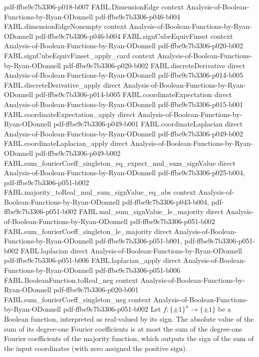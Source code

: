 \begin{theorem}
  {pdf-ffbe9c7b3306-p018-b007}
\proofstep
  {FABL.DimensionEdge}
  {context}
  {Analysis-of-Boolean-Functions-by-Ryan-ODonnell}
  {pdf-ffbe9c7b3306-p046-b004}
\proofstep
  {FABL.dimensionEdgeNonempty}
  {context}
  {Analysis-of-Boolean-Functions-by-Ryan-ODonnell}
  {pdf-ffbe9c7b3306-p046-b004}
\proofstep
  {FABL.signCubeEquivFinset}
  {context}
  {Analysis-of-Boolean-Functions-by-Ryan-ODonnell}
  {pdf-ffbe9c7b3306-p020-b002}
\proofstep
  {FABL.signCubeEquivFinset_apply_card}
  {context}
  {Analysis-of-Boolean-Functions-by-Ryan-ODonnell}
  {pdf-ffbe9c7b3306-p020-b002}
\proofstep
  {FABL.discreteDerivative}
  {direct}
  {Analysis-of-Boolean-Functions-by-Ryan-ODonnell}
  {pdf-ffbe9c7b3306-p014-b005}
\proofstep
  {FABL.discreteDerivative_apply}
  {direct}
  {Analysis-of-Boolean-Functions-by-Ryan-ODonnell}
  {pdf-ffbe9c7b3306-p014-b005}
\proofstep
  {FABL.coordinateExpectation}
  {direct}
  {Analysis-of-Boolean-Functions-by-Ryan-ODonnell}
  {pdf-ffbe9c7b3306-p015-b001}
\proofstep
  {FABL.coordinateExpectation_apply}
  {direct}
  {Analysis-of-Boolean-Functions-by-Ryan-ODonnell}
  {pdf-ffbe9c7b3306-p049-b001}
\proofstep
  {FABL.coordinateLaplacian}
  {direct}
  {Analysis-of-Boolean-Functions-by-Ryan-ODonnell}
  {pdf-ffbe9c7b3306-p049-b002}
\proofstep
  {FABL.coordinateLaplacian_apply}
  {direct}
  {Analysis-of-Boolean-Functions-by-Ryan-ODonnell}
  {pdf-ffbe9c7b3306-p049-b002}
\proofstep
  {FABL.sum_fourierCoeff_singleton_eq_expect_mul_sum_signValue}
  {direct}
  {Analysis-of-Boolean-Functions-by-Ryan-ODonnell}
  {pdf-ffbe9c7b3306-p025-b004,
    pdf-ffbe9c7b3306-p051-b002}
\proofstep
  {FABL.majority_toReal_mul_sum_signValue_eq_abs}
  {context}
  {Analysis-of-Boolean-Functions-by-Ryan-ODonnell}
  {pdf-ffbe9c7b3306-p043-b004,
    pdf-ffbe9c7b3306-p051-b002}
\proofstep
  {FABL.mul_sum_signValue_le_majority}
  {direct}
  {Analysis-of-Boolean-Functions-by-Ryan-ODonnell}
  {pdf-ffbe9c7b3306-p051-b002}
\proofstep
  {FABL.sum_fourierCoeff_singleton_le_majority}
  {direct}
  {Analysis-of-Boolean-Functions-by-Ryan-ODonnell}
  {pdf-ffbe9c7b3306-p051-b001,
    pdf-ffbe9c7b3306-p051-b002}
\proofstep
  {FABL.laplacian}
  {direct}
  {Analysis-of-Boolean-Functions-by-Ryan-ODonnell}
  {pdf-ffbe9c7b3306-p051-b006}
\proofstep
  {FABL.laplacian_apply}
  {direct}
  {Analysis-of-Boolean-Functions-by-Ryan-ODonnell}
  {pdf-ffbe9c7b3306-p051-b006}
\proofstep
  {FABL.BooleanFunction.toReal_neg}
  {context}
  {Analysis-of-Boolean-Functions-by-Ryan-ODonnell}
  {pdf-ffbe9c7b3306-p020-b001}
\proofstep
  {FABL.sum_fourierCoeff_singleton_neg}
  {context}
  {Analysis-of-Boolean-Functions-by-Ryan-ODonnell}
  {pdf-ffbe9c7b3306-p051-b002}
Let $f:\{\pm1\}^n\to\{\pm1\}$ be a Boolean function, interpreted as real-valued by its
sign. The absolute value of the sum of its degree-one Fourier coefficients is at most
the sum of the degree-one Fourier coefficients of the majority function, which outputs
the sign of the sum of the input coordinates (with zero assigned the positive sign).
\end{theorem}

